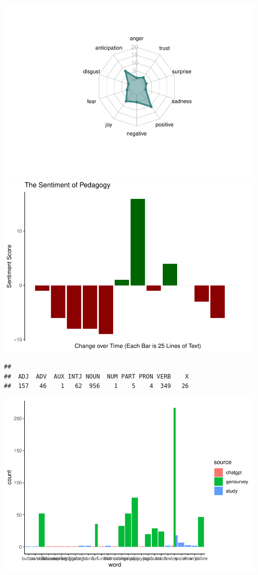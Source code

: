 \documentclass[
  english,
  man]{apa6}
\begin{document}
\includegraphics{capstone640_files/figure-latex/unnamed-chunk-4-1.pdf} \includegraphics{capstone640_files/figure-latex/unnamed-chunk-4-2.pdf}

\begin{verbatim}
## 
##  ADJ  ADV  AUX INTJ NOUN  NUM PART PRON VERB    X 
##  157   46    1   62  956    1    5    4  349   26
\end{verbatim}

\includegraphics{capstone640_files/figure-latex/unnamed-chunk-5-1.pdf}
\end{document}
